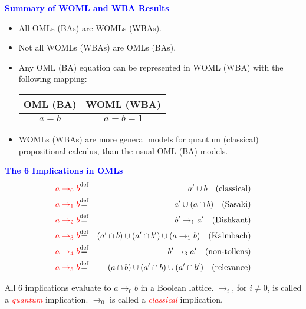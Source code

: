 \documentclass{slides}
\begin{document}
\begin{slide}
\textcolor{blue}{\textbf{Summary of WOML and WBA Results}}

\begin{itemize}
\item All OMLs (BAs) are WOMLs (WBAs).
\item Not all WOMLs (WBAs) are OMLs (BAs).
\item Any OML (BA) equation can be represented in WOML (WBA) with
the following mapping:
\begin{center}
\begin{tabular}{c|c}
OML (BA) & WOML (WBA)  \\
\hline
$a=b$ & $a\equiv b=1$
\end{tabular}
\end{center}
\item WOMLs (WBAs) are more general models for quantum (classical)
propositional calculus, than the usual OML (BA) models.
\end{itemize}
\end{slide}


\begin{slide}

\textcolor{blue}{\textbf{The 6 Implications in OMLs}}
\begin{eqnarray}
\textcolor{red}{a\to_0b} &
{\buildrel\rm def\over =}& a'\cup b \quad\mbox{(classical)}\\
\textcolor{red}{a\to_1b} &
{\buildrel\rm def\over =}& a'\cup(a\cap b) \quad\mbox{(Sasaki)}\\
\textcolor{red}{a\to_2b} &
{\buildrel\rm
def\over =}&\ b'\to_1a'  \quad\mbox{(Dishkant)}\\
\textcolor{red}{a\to_3b} &
{\buildrel\rm def\over =}& (a'\cap b)\cup(a'\cap b')\cup
(a\to_1b)                 \quad\mbox{(Kalmbach)}\\
\textcolor{red}{a\to_4b} & {\buildrel\rm def\over =}&
b'\to_3a'                            \quad\mbox{(non-tollens)}\\
\textcolor{red}{a\to_5b} & {\buildrel\rm def\over =}&
(a\cap b)\cup(a'\cap b)\cup(a'\cap b')  \quad\mbox{(relevance)}
\end{eqnarray}

All 6 implications evaluate
to $a\to_0b$ in a Boolean lattice.
$\to_i$, for $i\ne 0$, is called a
\textcolor{red}{{\em quantum}} implication.  $\to_0$ is
called a \textcolor{red}{{\em classical}} implication.

\end{slide}
\end{document}
